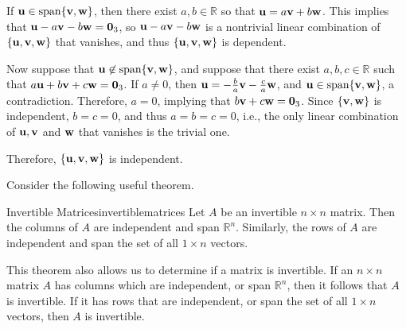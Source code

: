 \begin{solution}
If ${\bf u}\in\mbox{span}\{{\bf v},{\bf w}\}$, then there exist $a,b\in\mathbb{R}$ so
that ${\bf u}=a{\bf v} + b{\bf w}$.
This implies that ${\bf u}-a{\bf v} - b{\bf w}={\bf 0}_3$,
so  ${\bf u}-a{\bf v} - b{\bf w}$
is a nontrivial linear combination of $\{ {\bf u},{\bf v},{\bf w}\}$ that
vanishes, 
and thus $\{ {\bf u},{\bf v},{\bf w}\}$ is dependent.

Now suppose that ${\bf u}\not\in\mbox{span}\{{\bf v},{\bf w}\}$, and suppose
that there exist $a,b,c\in\mathbb{R}$ such that
$a{\bf u}+b{\bf v}+c{\bf w}={\bf 0}_3$.
If $a\neq 0$, then ${\bf u}=-\frac{b}{a}{\bf v}-\frac{c}{a}{\bf w}$,
and ${\bf u}\in\mbox{span}\{{\bf v},{\bf w}\}$, a contradiction.
Therefore, $a=0$, implying that $b{\bf v}+c{\bf w}={\bf 0}_3$.
Since $\{ {\bf v},{\bf w}\}$ is independent, $b=c=0$, and thus
$a=b=c=0$, i.e., the only linear combination of 
${\bf u},{\bf v}$ and ${\bf w}$ that vanishes is the trivial one.

Therefore, $\{ {\bf u},{\bf v},{\bf w}\}$ is independent.
\end{solution}

Consider the following useful theorem.

\begin{theorem}{Invertible Matrices}{invertiblematrices}
Let $A$ be an invertible $n \times n$ matrix. Then the columns of $A$ are independent and span $\mathbb{R}^n$. Similarly, the rows of $A$ are independent and span the set of all $1 \times n$ vectors. 
\end{theorem}

This theorem also allows us to determine if a matrix is invertible. If an $n \times n$ matrix $A$ has columns which are independent, or span $\mathbb{R}^n$, then it follows that $A$ is invertible. If it has rows that are independent, or span the set of all $1 \times n$ vectors, then $A$ is invertible.
